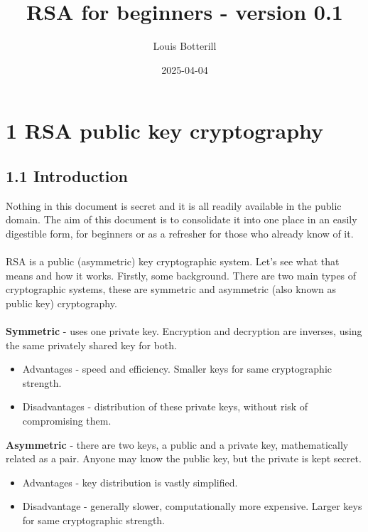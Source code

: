 \documentclass[11pt]{article}   	%
\title{RSA for beginners - version 0.1}
\author{Louis Botterill}
\date{2025-04-04}					%
\begin{document}
\maketitle

\pagebreak

\section*{1 RSA public key cryptography}

\subsection*{1.1 Introduction}

Nothing in this document is secret and it is all readily available in the public domain. The aim of this document is to consolidate it into one place in an easily digestible form, for beginners or as a refresher for those who already know of it. \\
\\
RSA is a public (asymmetric) key cryptographic system. Let's see what that means and how it works.
Firstly, some background. There are two main types of cryptographic systems, these are symmetric and asymmetric (also known as public key) cryptography. \\
\\
\textbf{Symmetric} - uses one private key. Encryption and decryption are inverses, using the same privately shared key for both.
\begin{itemize}
 \item Advantages - speed and efficiency. Smaller keys for same cryptographic strength.
 \item Disadvantages - distribution of these private keys, without risk of compromising them.
\end{itemize}

\textbf{Asymmetric} - there are two keys, a public and a private key, mathematically related as a pair. Anyone may know the public key, but the private is kept secret.
\begin{itemize}
 \item Advantages - key distribution is vastly simplified.
 \item Disadvantage - generally slower, computationally more expensive. Larger keys for same cryptographic strength.
\end{itemize}
\end{document}
